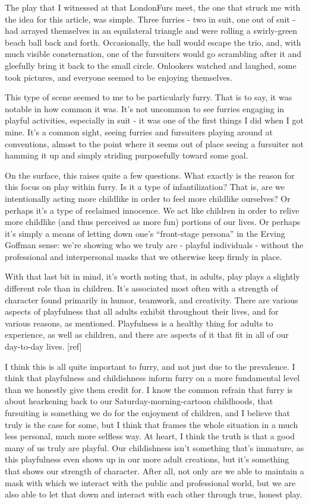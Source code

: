  The play that I witnessed at that LondonFurs meet, the one that struck me with the idea for this article, was simple. Three furries - two in suit, one out of suit - had arrayed themselves in an equilateral triangle and were rolling a swirly-green beach ball back and forth. Occasionally, the ball would escape the trio, and, with much visible consternation, one of the fursuiters would go scrambling after it and gleefully bring it back to the small circle. Onlookers watched and laughed, some took pictures, and everyone seemed to be enjoying themselves.

This type of scene seemed to me to be particularly furry. That is to say, it was notable in how common it was. It's not uncommon to see furries engaging in playful activities, especially in suit - it was one of the first things I did when I got mine. It's a common sight, seeing furries and fursuiters playing around at conventions, almost to the point where it seems out of place seeing a fursuiter not hamming it up and simply striding purposefully toward some goal.

On the surface, this raises quite a few questions. What exactly is the reason for this focus on play within furry. Is it a type of infantilization? That is, are we intentionally acting more childlike in order to feel more childlike ourselves? Or perhaps it's a type of reclaimed innocence. We act like children in order to relive more childlike (and thus perceived as more fun) portions of our lives. Or perhaps it's simply a means of letting down one's ``front-stage persona'' in the Erving Goffman sense: we're showing who we truly are - playful individuals - without the professional and interpersonal masks that we otherwise keep firmly in place.

 With that last bit in mind, it's worth noting that, in adults, play plays a slightly different role than in children. It's associated most often with a strength of character found primarily in humor, teamwork, and creativity. There are various aspects of playfulness that all adults exhibit throughout their lives, and for various reasons, as mentioned. Playfulness is a healthy thing for adults to experience, as well as children, and there are aspects of it that fit in all of our day-to-day lives. {[}ref{]}

I think this is all quite important to furry, and not just due to the prevalence. I think that playfulness and childishness inform furry on a more fundamental level than we honestly give them credit for. I know the common refrain that furry is about hearkening back to our Saturday-morning-cartoon childhoods, that fursuiting is something we do for the enjoyment of children, and I believe that truly is the case for some, but I think that frames the whole situation in a much less personal, much more selfless way. At heart, I think the truth is that a good many of us truly are playful. Our childishness isn't something that's immature, as this playfulness even shows up in our more adult creations, but it's something that shows our strength of character. After all, not only are we able to maintain a mask with which we interact with the public and professional world, but we are also able to let that down and interact with each other through true, honest play.
